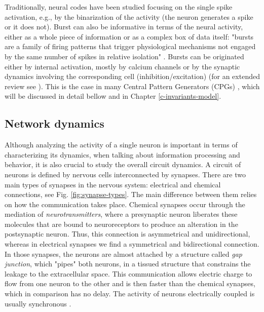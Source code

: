 Traditionally, neural codes have been studied focusing on the single spike activation, e.g., by the binarization of the activity (the neuron generates a spike or it does not). Burst can also be informative in terms of the neural activity, either as a whole piece of information or as a complex box of data itself: "bursts are a family of firing patterns that trigger physiological mechanisms not engaged by the same number of spikes in relative isolation" \parencite{friedenberger_silences_2023}. Bursts can be originated either by internal activation, mostly by calcium channels or by the synaptic dynamics involving the corresponding cell (inhibition/excitation) (for an extended review see \parencite{friedenberger_silences_2023}). This is the case in many Central Pattern Generators (CPGs) \parencite{Katz,steuer_central_2018}, which will be discussed in detail bellow and in Chapter \ref{c-invariants-model}.

\subsection{Network dynamics}

Although analyzing the activity of a single neuron is important in terms of characterizing its dynamics, when talking about information processing and behavior, it is also crucial to study the overall circuit dynamics. A circuit of neurons is defined by nervous cells interconnected by synapses. There are two main types of synapses in the nervous system: electrical and chemical connections, see Fig. \ref{fig:synapse-types}. The main difference between them relies on how the communication takes place. Chemical synapses occur through the mediation of \textit{neurotransmitters}, where a presynaptic neuron liberates these molecules that are bound to neuroreceptors to produce an alteration in the postsynaptic neuron. Thus, this connection is asymmetrical and unidirectional, whereas in electrical synapses we find a symmetrical and bidirectional connection. In those synapses, the neurons are almost attached by a structure called \textit{gap junction}, which "pipes" both neurons, in a tissued structure that constrains the leakage to the extracellular space. This communication allows electric charge to flow from one neuron to the other and is then faster than the chemical synapses, which in comparison has no delay. The activity of neurons electrically coupled is usually synchronous \parencite{levitan_neuron_2002}.

